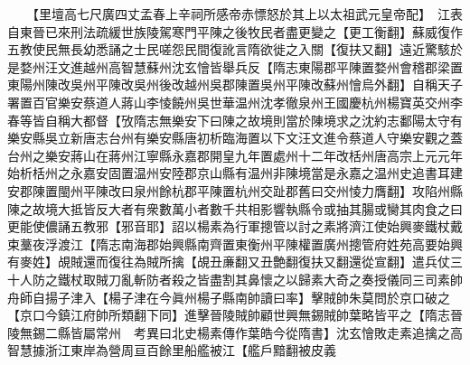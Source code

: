　　【里壇高七尺廣四丈孟春上辛祠所感帝赤慓怒於其上以太祖武元皇帝配】　江表自東晉已來刑法疏緩世族陵駕寒門平陳之後牧民者盡更變之【更工衡翻】蘇威復作五教使民無長幼悉誦之士民嗟怨民間復訛言隋欲徙之入關【復扶又翻】遠近驚駭於是婺州汪文進越州高智慧蘇州沈玄懀皆舉兵反【隋志東陽郡平陳置婺州會稽郡梁置東陽州陳改吳州平陳改吳州後改越州吳郡陳置吳州平陳改蘇州懀烏外翻】自稱天子署置百官樂安蔡道人蔣山李㥄饒州吳世華温州沈孝徹泉州王國慶杭州楊寶英交州李春等皆自稱大都督【攷隋志無樂安下曰陳之故境則當於陳境求之沈約志鄱陽太守有樂安縣吳立新唐志台州有樂安縣唐初析臨海置以下文汪文進令蔡道人守樂安觀之蓋台州之樂安蔣山在蔣州江寧縣永嘉郡開皇九年置處州十二年改栝州唐高宗上元元年始析栝州之永嘉安固置温州安陸郡京山縣有温州非陳境當是永嘉之温州史追書耳建安郡陳置閩州平陳改曰泉州餘杭郡平陳置杭州交趾郡舊曰交州㥄力膺翻】攻陷州縣陳之故境大抵皆反大者有衆數萬小者數千共相影響執縣令或抽其腸或臠其肉食之曰更能使儂誦五教邪【邪音耶】詔以楊素為行軍摠管以討之素將濟江使始興麥鐵杖戴束藳夜浮渡江【隋志南海郡始興縣南齊置東衡州平陳權置廣州摠管府姓苑高要始興有麥姓】覘賊還而復往為賊所擒【覘丑亷翻又丑艶翻復扶又翻還從宣翻】遣兵仗三十人防之鐵杖取賊刀亂斬防者殺之皆盡割其鼻懷之以歸素大奇之奏授儀同三司素帥舟師自揚子津入【楊子津在今眞州楊子縣南帥讀曰率】擊賊帥朱莫問於京口破之【京口今鎮江府帥所類翻下同】進擊晉陵賊帥顧世興無錫賊帥葉略皆平之【隋志晉陵無錫二縣皆屬常州　考異曰北史楊素傳作葉皓今從隋書】沈玄懀敗走素追擒之高智慧據浙江東岸為營周亘百餘里船艦被江【艦戶黯翻被皮義